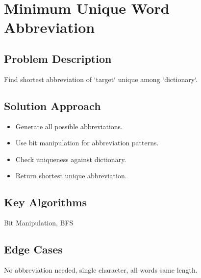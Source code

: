 \documentclass[10pt, a4paper]{article}
\begin{document}
\section{Minimum Unique Word Abbreviation}
\subsection*{Problem Description}
Find shortest abbreviation of `target` unique among `dictionary`.

\subsection*{Solution Approach}
\begin{itemize}
    \item Generate all possible abbreviations.
    \item Use bit manipulation for abbreviation patterns.
    \item Check uniqueness against dictionary.
    \item Return shortest unique abbreviation.
\end{itemize}

\subsection*{Key Algorithms}
Bit Manipulation, BFS

\subsection*{Edge Cases}
No abbreviation needed, single character, all words same length.
\end{document}

